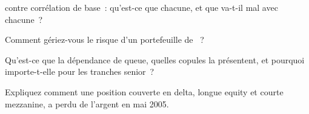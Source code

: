 \begin{interviewq}\label{iq:rc:portfolio-credit:3}
 contre corrélation de base~: qu'est-ce que chacune, et que va-t-il mal avec chacune~?
\end{interviewq}

\begin{interviewq}\label{iq:rc:portfolio-credit:4}
Comment gériez-vous le risque d'un portefeuille de ~?
\end{interviewq}

\begin{interviewq}\label{iq:rc:portfolio-credit:5}
Qu'est-ce que la dépendance de queue, quelles copules la présentent, et pourquoi
importe-t-elle pour les tranches senior~?
\end{interviewq}

\begin{interviewq}\label{iq:rc:portfolio-credit:6}
Expliquez comment une position couverte en delta, longue equity et courte mezzanine, a perdu de l'argent en mai 2005.
\end{interviewq}
